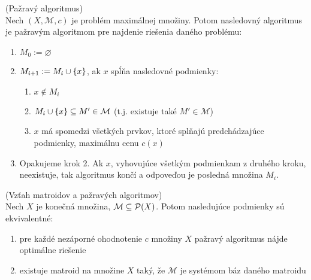 \begin{definition}{(Pažravý algoritmus)}\\
Nech $(X, \mathcal{M}, c)$ je problém maximálnej množiny. Potom nasledovný algoritmus je pažravým algoritmom pre najdenie riešenia
daného problému:
\begin{enumerate}
    \item $M_0 := \varnothing$
    \item $M_{i+1} := M_i \cup \left\{x\right\}$, ak $x$ spĺňa nasledovné podmienky:
    \begin{enumerate}
        \item $x \not\in M_i$
        \item $M_i \cup \left\{x\right\} \subseteq M' \in \mathcal{M}$ (t.j. existuje také $M' \in \mathcal{M}$)
        \item $x$ má spomedzi všetkých prvkov, ktoré splňajú predchádzajúce podmienky, maximálnu cenu $c(x)$
    \end{enumerate}
    \item Opakujeme krok 2. Ak $x$, vyhovujúce všetkým podmienkam z druhého kroku, neexistuje, tak algoritmus končí a odpoveďou je posledná množina $M_i$.
\end{enumerate}
\end{definition}

\begin{theorem}{(Vzťah matroidov a pažravých algoritmov)}\\
Nech $X$ je konečná množina, $\mathcal{M} \subseteq \mathcal{P}(X)$. Potom nasledujúce podmienky sú ekvivalentné:
\begin{enumerate}
    \item pre každé nezáporné ohodnotenie $c$ množiny $X$ pažravý algoritmus nájde optimálne riešenie
    \item existuje matroid na množine $X$ taký, že $\mathcal{M}$ je systémom báz daného matroidu 
\end{enumerate}
\end{theorem}
